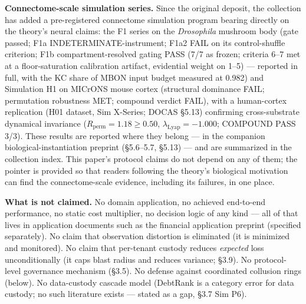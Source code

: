\documentclass[
]{article}
\begin{document}
\textbf{Connectome-scale simulation series.} Since the original deposit,
the collection has added a pre-registered connectome simulation program
bearing directly on the theory's neural claims: the F1 series on the
\emph{Drosophila} mushroom body (gate passed; F1a
INDETERMINATE-instrument; F1a2 FAIL on its control-shuffle criterion;
F1b compartment-resolved gating PASS (7/7 as frozen; criteria 6--7 met
at a floor-saturation calibration artifact, evidential weight on 1--5)
--- reported in full, with the KC share of MBON input budget measured at
0.982) and Simulation H1 on MICrONS mouse cortex (structural dominance
FAIL; permutation robustness MET; compound verdict FAIL), with a
human-cortex replication (H01 dataset, Sim X-Series; DOCAS §5.13)
confirming cross-substrate dynamical invariance
(\(R_{\mathrm{perm}} = 1.18 \ge 0.50\),
\(\lambda_{\mathrm{Lyap}} = -1.000\); COMPOUND PASS 3/3). These results
are reported where they belong --- in the companion
biological-instantiation preprint (§5.6--5.7, §5.13) --- and are
summarized in the collection index. This paper's protocol claims do not
depend on any of them; the pointer is provided so that readers following
the theory's biological motivation can find the connectome-scale
evidence, including its failures, in one place.

\textbf{What is not claimed.} No domain application, no achieved
end-to-end performance, no static cost multiplier, no decision logic of
any kind --- all of that lives in application documents such as the
financial application preprint (specified separately). No claim that
observation distortion is eliminated (it is minimized and monitored). No
claim that per-tenant custody reduces \emph{expected} loss
unconditionally (it caps blast radius and reduces variance; §3.9). No
protocol-level governance mechanism (§3.5). No defense against
coordinated collusion rings (below). No data-custody cascade model
(DebtRank is a category error for data custody; no such literature
exists --- stated as a gap, §3.7 Sim P6).
\end{document}
